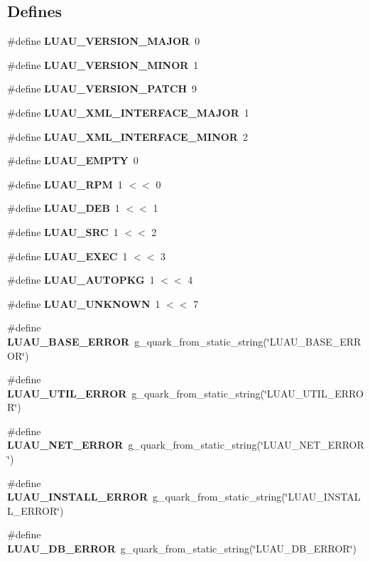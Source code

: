 \subsection*{Defines}
\begin{CompactItemize}
\item 
\#define {\bf LUAU\_\-VERSION\_\-MAJOR}\ 0
\item 
\#define {\bf LUAU\_\-VERSION\_\-MINOR}\ 1
\item 
\#define {\bf LUAU\_\-VERSION\_\-PATCH}\ 9
\item 
\#define {\bf LUAU\_\-XML\_\-INTERFACE\_\-MAJOR}\ 1
\item 
\#define {\bf LUAU\_\-XML\_\-INTERFACE\_\-MINOR}\ 2
\item 
\#define {\bf LUAU\_\-EMPTY}\ 0
\item 
\#define {\bf LUAU\_\-RPM}\ 1 $<$$<$ 0
\item 
\#define {\bf LUAU\_\-DEB}\ 1 $<$$<$ 1
\item 
\#define {\bf LUAU\_\-SRC}\ 1 $<$$<$ 2
\item 
\#define {\bf LUAU\_\-EXEC}\ 1 $<$$<$ 3
\item 
\#define {\bf LUAU\_\-AUTOPKG}\ 1 $<$$<$ 4
\item 
\#define {\bf LUAU\_\-UNKNOWN}\ 1 $<$$<$ 7
\item 
\#define {\bf LUAU\_\-BASE\_\-ERROR}\ g\_\-quark\_\-from\_\-static\_\-string(\char`\"{}LUAU\_\-BASE\_\-ERROR\char`\"{})
\item 
\#define {\bf LUAU\_\-UTIL\_\-ERROR}\ g\_\-quark\_\-from\_\-static\_\-string(\char`\"{}LUAU\_\-UTIL\_\-ERROR\char`\"{})
\item 
\#define {\bf LUAU\_\-NET\_\-ERROR}\ g\_\-quark\_\-from\_\-static\_\-string(\char`\"{}LUAU\_\-NET\_\-ERROR\char`\"{})
\item 
\#define {\bf LUAU\_\-INSTALL\_\-ERROR}\ g\_\-quark\_\-from\_\-static\_\-string(\char`\"{}LUAU\_\-INSTALL\_\-ERROR\char`\"{})
\item 
\#define {\bf LUAU\_\-DB\_\-ERROR}\ g\_\-quark\_\-from\_\-static\_\-string(\char`\"{}LUAU\_\-DB\_\-ERROR\char`\"{})
\end{CompactItemize}
